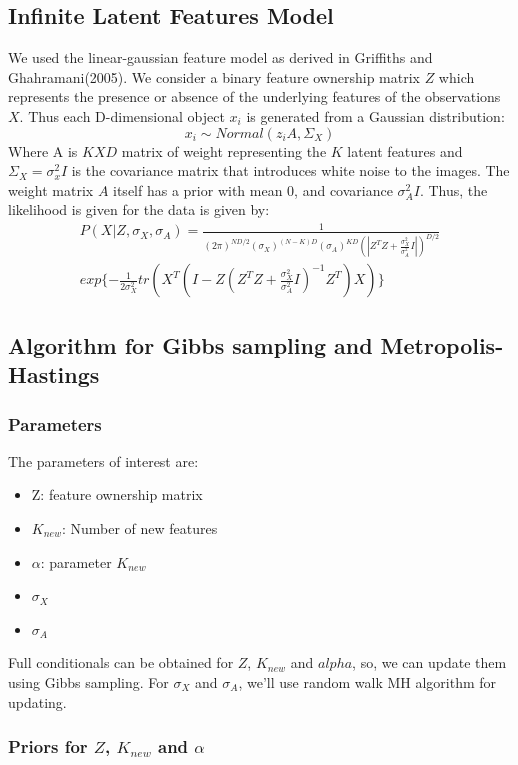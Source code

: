 \documentclass{article}
\begin{document}
\subsection{Infinite Latent Features Model}
We used the linear-gaussian feature model as derived in Griffiths and Ghahramani(2005). We consider a binary feature ownership matrix $Z$ which represents the presence or absence of the underlying features of the observations $X$. Thus each D-dimensional object $x_i$ is generated from a Gaussian distribution:
\[
x_i \sim Normal(z_iA, \Sigma_X)
\]
Where A is $KXD$ matrix of weight representing the $K$ latent features and $\Sigma_X= \sigma^2_xI$ is the covariance matrix that introduces white noise to the images. The weight matrix $A$ itself has a prior with mean 0, and covariance $\sigma^2_AI$. Thus, the likelihood is given for the data is given by:
\begin{multline}\label{eq:lik}
P(X|Z,\sigma_X, \sigma_A) = \frac{1}{(2 \pi)^{ND/2} (\sigma_X)^{(N-K)D}(\sigma_A)^{KD}(|Z^TZ+\frac{\sigma_X^2}{\sigma_A^2}I|)^{D/2}}\\
exp\{-\frac{1}{2\sigma_X^2}tr(X^T(I-Z(Z^TZ+\frac{\sigma_X^2}{\sigma_A^2}I)^{-1}Z^T)X)\}
\end{multline}


\subsection{Algorithm for Gibbs sampling and Metropolis-Hastings}

\subsubsection{Parameters}
The parameters of interest are:
\begin{itemize}
\item{Z: feature ownership matrix}
\item{$K_{new}$: Number of new features}
\item{$\alpha$: parameter $K_{new}$}
\item{$\sigma_X$}
\item{$\sigma_A$}
\end{itemize}

Full conditionals can be obtained for $Z$, $K_{new}$ and $alpha$, so, we can update them using Gibbs sampling. For $\sigma_X$ and $\sigma_A$, we'll use random walk MH algorithm for updating.\\
\subsubsection{Priors for $Z$, $K_{new}$ and $\alpha$}
\end{document}
